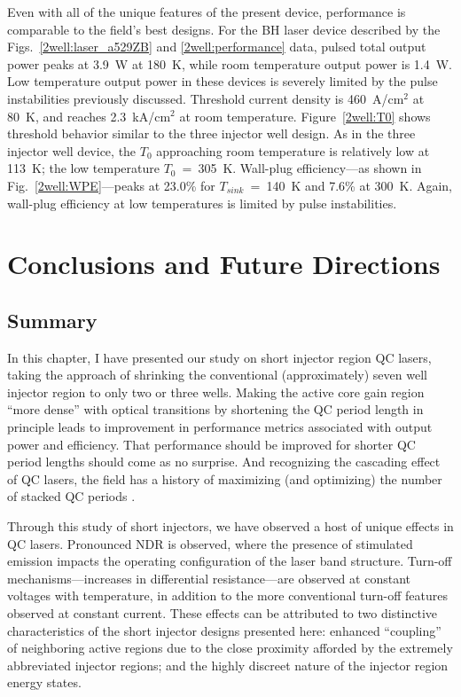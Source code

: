 Even with all of the unique features of the present device, performance is comparable to the field's best designs.  For the BH laser device described by the Figs.~\ref{2well:laser_a529ZB} and \ref{2well:performance} data, pulsed total output power peaks at 3.9~W at 180~K, while room temperature output power is 1.4~W.  Low temperature output power in these devices is severely limited by the pulse instabilities previously discussed.  Threshold current density is 460~A/cm$^2$ at 80~K, and reaches 2.3~kA/cm$^2$ at room temperature.  Figure~\ref{2well:T0} shows threshold behavior similar to the three injector well design.  As in the three injector well device, the $T_0$ approaching room temperature is relatively low at 113~K; the low temperature $T_0$~=~305~K.  Wall-plug efficiency---as shown in Fig.~\ref{2well:WPE}---peaks at 23.0\% for $T_{sink}$~=~140~K and 7.6\% at 300~K.  Again, wall-plug efficiency at low temperatures is limited by pulse instabilities.



\section{Conclusions and Future Directions}

\subsection{Summary}
In this chapter, I have presented our study on short injector region QC lasers, taking the approach of shrinking the conventional (approximately) seven well injector region to only two or three wells.  Making the active core gain region ``more dense'' with optical transitions by shortening the QC period length in principle leads to improvement in performance metrics associated with output power and efficiency. That performance should be improved for shorter QC period lengths should come as no surprise.  And recognizing the cascading effect of QC lasers, the field has a history of maximizing (and optimizing) the number of stacked QC periods \cite{Gmachl:JSTQE:1999}.

Through this study of short injectors, we have observed a host of unique effects in QC lasers.  Pronounced NDR is observed, where the presence of stimulated emission impacts the operating configuration of the laser band structure.  Turn-off mechanisms---increases in differential resistance---are observed at constant voltages with temperature, in addition to the more conventional turn-off features observed at constant current.  These effects can be attributed to two distinctive characteristics of the short injector designs presented here: enhanced ``coupling'' of neighboring active regions due to the close proximity afforded by the extremely abbreviated injector regions; and the highly discreet nature of the injector region energy states. %

